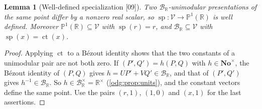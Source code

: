 \documentclass[11pt,oneside]{article}
\numberwithin{equation}{section}
\newtheorem{lemma}[lemma]{Lemma}
\theoremstyle{definition}
\theoremstyle{remark}
\newcommand{\No}{\mathbf{No}}
\newcommand{\R}{\mathbb R}
\newcommand{\BR}{\mathcal B_{\R}}
\newcommand{\ct}{\operatorname{ct}}
\newcommand{\src}[1]{\textup{\textsf{\small[#1]}}}
\newcommand{\spz}{\operatorname{sp}}
\newcommand{\Vreg}{\mathcal V}
\begin{document}
\begin{lemma}[Well-defined specialization \src{09}]\label{odg:frac:lem:welldefined}
Two $\BR$-unimodular presentations of the same point differ by a nonzero real
scalar, so $\spz:\Vreg\to\mathbb P^1(\R)$ is well defined. Moreover
$\mathbb P^1(\R)\subseteq\Vreg$ with $\spz(r)=r$, and $\BR\subseteq\Vreg$ with
$\spz(x)=\ct(x)$.
\end{lemma}
\begin{proof}
Applying $\ct$ to a B\'ezout identity shows that the two constants of a
unimodular pair are not both zero. If $(P',Q')=h(P,Q)$ with $h\in\No^\times$,
the B\'ezout identity of $(P,Q)$ gives $h=UP'+VQ'\in\BR$, and that of
$(P',Q')$ gives $h^{-1}\in\BR$. So $h\in\BR^\times=\R^\times$
(\cref{odg:prop:units}), and the constant vectors define the same point. Use
the pairs $(r,1)$, $(1,0)$ and $(x,1)$ for the last assertions.
\end{proof}
\end{document}
